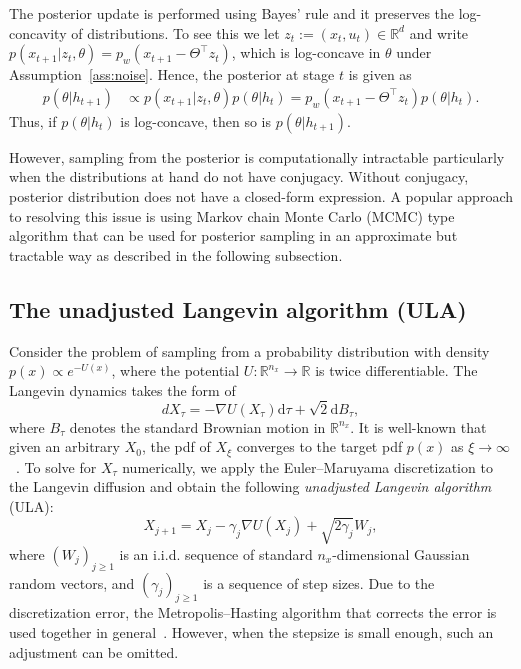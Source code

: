 \documentclass[11pt]{article}
\theoremstyle{plain}
\theoremstyle{definition}
\theoremstyle{remark}
\newcommand{\R}{\mathbb{R}}
\begin{document}
The posterior update is performed using Bayes’ rule and it preserves the log-concavity of distributions. To see this we let $z_t:=(x_t,u_t)\in\R^d$ and write $
p(x_{t+1} |z_t, \theta) = p_w (x_{t+1} - \Theta^{\top}  z_t )$,
which is log-concave in $\theta$ under Assumption~\ref{ass:noise}. Hence, the posterior at stage $t$ is given as
\begin{equation}\label{posterior}
\begin{split}
p(\theta | h_{t+1}) &\propto p(x_{t+1} | z_t, \theta ) p(\theta |h_t) = p_w (x_{t+1} - \Theta^{\top}  z_t ) p(\theta  | h_t).
\end{split}
\end{equation}
Thus, if $p(\theta  | h_t)$ is log-concave, then so is $p(\theta | h_{t+1})$.

However, sampling from the posterior is computationally intractable particularly
when the distributions at hand do not have conjugacy. Without conjugacy, posterior distribution does not have a closed-form expression. 
A popular approach to resolving this issue is 
using Markov chain Monte Carlo (MCMC) type algorithm that can be used for posterior sampling in an approximate but tractable way as described in the following subsection. 



\subsection{The unadjusted Langevin algorithm (ULA)}


Consider the problem of sampling from a probability distribution with density $p (x) \propto e^{-U(x)}$, where the potential $U: \mathbb{R}^{n_x} \to \mathbb{R}$ is twice differentiable. 
The Langevin dynamics takes the form of 
\begin{equation}\label{eq:cont}
dX_\tau = - \nabla U(X_\tau) \mathrm{d}\tau + \sqrt{2} \mathrm{d} B_\tau,
\end{equation}
where  $B_\tau$ denotes the standard Brownian motion in $\mathbb{R}^{n_x}$.
It is well-known that given an arbitrary $X_0$, the pdf of $X_{\xi}$ converges to the target pdf $p(x)$ as $\xi \to \infty$~\cite{mou2019high,pavliotis2014stochastic}. 
To solve for $X_\tau$ numerically, 
we apply the Euler--Maruyama discretization to the Langevin diffusion  and obtain the following \emph{unadjusted Langevin algorithm} (ULA):
\begin{equation}\label{eq:ula}
X_{j+1} = X_j - \gamma_j \nabla U(X_j) + \sqrt{2\gamma_j} W_j,
\end{equation}
where $(W_j)_{j\geq 1}$ is an i.i.d. sequence of standard $n_x$-dimensional Gaussian random vectors, and  $(\gamma_j)_{j\geq 1}$ is a sequence of step  sizes. 
Due to the discretization error, the Metropolis--Hasting algorithm that corrects the error is used together in general~\cite{roberts1996exponential,roberts2002langevin,bou2013nonasymptotic}.
However, when the stepsize is small enough, such an adjustment can be omitted.
\end{document}
